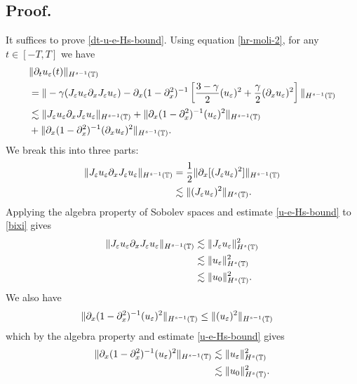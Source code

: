 \subsection{Proof.}  It suffices to prove  \eqref{dt-u-e-Hs-bound}.
Using equation \eqref{hr-moli-2}, for any $t\in [-T, T]$ we have
%
\begin{equation*}
\begin{split}
& \| \partial_t u_\varepsilon(t) \|_{H^{s-1}(\mathbb{T})}  
\\
& = 
\| -\gamma (J_\varepsilon u_\varepsilon \partial_x  J_\varepsilon  u_\varepsilon) -
\partial_x (1-\partial_x^2)^{-1} \left [\frac{3-\gamma}{2} (u_\varepsilon)^2 +
\frac{\gamma}{2}(\partial_x u_\varepsilon)^2 \right ] \|_{H^{s-1}(\mathbb{T})}
\\
& \lesssim  
\| J_\varepsilon u_\varepsilon \partial_x  J_\varepsilon  u_\varepsilon \|_{H^{s-1}(\mathbb{T})}
+ \|\partial_x (1-\partial_x^2)^{-1} (u_\varepsilon)^2 \|_{H^{s-1}(\mathbb{T})}
\\
& + \| \partial_x (1-\partial_x^2)^{-1}(\partial_x u_\varepsilon)^2\|_{H^{s-1}(\mathbb{T})}.
\end{split}
\end{equation*}
We break this into three parts:
\begin{equation}
\label{bixi}
\begin{split}
\| J_\varepsilon u_\varepsilon \partial_x J_\varepsilon u_\varepsilon \|_{H^{s-1}(\mathbb{T})}
& = 
\frac{1}{2}\|\partial_x[(J_\varepsilon u_\varepsilon
)^2]\|_{H^{s-1}(\mathbb{T})}
\\
& \lesssim \|(J_\varepsilon u_\varepsilon )^2\|_{H^s(\mathbb{T})}.
\end{split}
\end{equation}
Applying the algebra property of Sobolev spaces and estimate
\eqref{u-e-Hs-bound} to \eqref{bixi} gives 
%
\begin{equation}
\label{deriv1}
\begin{split}
\|J_\varepsilon u_\varepsilon \partial_x J_\varepsilon u_\varepsilon  
\|_{H^{s-1}(\mathbb{T})}
& \lesssim
\|J_\varepsilon u_\varepsilon \|_{H^s(\mathbb{T})}^2
\\
&\lesssim
\| u_\varepsilon \|_{H^s(\mathbb{T})}^2
\\
&\lesssim
\|u_0\|_{H^s(\mathbb{T})}^2.
\end{split}
\end{equation}
We also have
\begin{equation*}
\begin{split}
\|\partial_x (1-\partial_x^2)^{-1} (u_\varepsilon)^2\|_{H^{s-1}(\mathbb{T})}
& \le \| (u_\varepsilon)^2\|_{H^{s-1}(\mathbb{T})}
\end{split}
\end{equation*}
which by the algebra property and estimate \eqref{u-e-Hs-bound}
gives
\begin{equation}
\begin{split}
\label{deriv2}
\|\partial_x (1-\partial_x^2)^{-1} (u_\varepsilon)^2\|_{H^{s-1}(\mathbb{T})}
& \lesssim \|u_\varepsilon\|^2_{H^s(\mathbb{T})} 
\\
& \lesssim  \|u_0\|^2_{H^s(\mathbb{T})}.
\end{split}
\end{equation}
